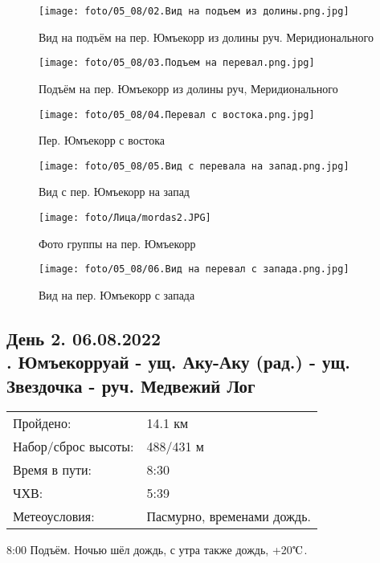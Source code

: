 \begin{figure}
    \centering
    \texttt{[image: foto/05\_08/02.Вид на подъем из долины.png.jpg]}
    \caption{Вид на подъём на пер. Юмъекорр из долины руч. Меридионального}
\end{figure}

\begin{figure}
    \centering
    \texttt{[image: foto/05\_08/03.Подъем на перевал.png.jpg]}
    \caption{Подъём на пер. Юмъекорр из долины руч, Меридионального}
\end{figure}

\begin{figure}
    \centering
    \texttt{[image: foto/05\_08/04.Перевал с востока.png.jpg]}
    \caption{Пер. Юмъекорр с востока}
\end{figure}

\begin{figure}
    \centering
    \texttt{[image: foto/05\_08/05.Вид с перевала на запад.png.jpg]}
    \caption{Вид с пер. Юмъекорр на запад}
\end{figure}

\begin{figure}
    \centering
    \texttt{[image: foto/Лица/mordas2.JPG]}
    \caption{Фото группы на пер. Юмъекорр}
\end{figure}

\begin{figure}
    \centering
    \texttt{[image: foto/05\_08/06.Вид на перевал с запада.png.jpg]}
    \caption{Вид на пер. Юмъекорр с запада}
\end{figure}

\subsection{День 2. 06.08.2022\\
. Юмъекорруай - ущ. Аку-Аку (рад.) - ущ. Звездочка - руч. Медвежий Лог}
\begin{tabular}{l p{12cm}}
\hline
Пройдено: & 14.1 км\\
Набор/сброс высоты: & 488/431 м\\
Время в пути: & 8:30\\
ЧХВ: & 5:39\\
Метеоусловия: & Пасмурно, временами дождь.\\
\hline
\end{tabular}

8:00 Подъём.
Ночью шёл дождь, с утра также дождь, +20$\tccentigrade$.


